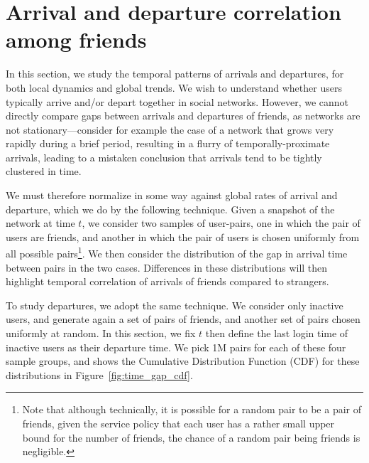 \documentclass[phd,tocprelim]{cornell}
\begin{document}
\section{Arrival and departure correlation among friends}
In this section, we study the temporal patterns of arrivals and
departures, for both local dynamics and global trends.  We wish to understand whether users typically arrive
and/or depart together in social networks.  However, we cannot
directly compare gaps between arrivals and departures of friends, as
networks are not stationary---consider for example the case of a
network that grows very rapidly during a brief period, resulting in a
flurry of temporally-proximate arrivals, leading to a mistaken
conclusion that arrivals tend to be tightly clustered in time.

We must therefore normalize in some way against global rates of
arrival and departure, which we do by the following technique. Given a snapshot of the network at time $t$, we
consider two samples of user-pairs, one in which the pair of users are
friends, and another in which the pair of users is chosen uniformly
from all possible pairs\footnote{Note that although technically, it is possible for a random pair to be a pair of friends, 
given the service policy that each user has a rather small upper bound for the number of friends, the chance of a random pair being friends is negligible.}.  We then consider the distribution of the gap in arrival time between pairs in the two cases.  Differences in these
distributions will then highlight temporal correlation of arrivals of
friends compared to strangers.

To study departures, we adopt the same technique.  We consider only
inactive users, and generate again a set of
pairs of friends, and another set of pairs chosen uniformly at random.
In this section, we fix $t$  then define the last login time of inactive users as their departure time. We pick 1M pairs for each of these four sample groups, and shows the
Cumulative Distribution Function (CDF) for these distributions in Figure~\ref{fig:time_gap_cdf}.
\end{document}
